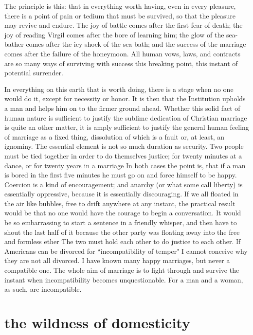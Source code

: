 \documentclass[final,10pt,letterpaper,twocolumn,openany]{book}
\begin{document}
The principle is this: that in everything worth having, even in every
pleasure, there is a point of pain or tedium that must be survived, so that
the pleasure may revive and endure. The joy of battle comes after the first
fear of death; the joy of reading Virgil comes after the bore of learning
him; the glow of the sea-bather comes after the icy shock of the sea bath;
and the success of the marriage comes after the failure of the honeymoon.
All human vows, laws, and contracts are so many ways of surviving with
success this breaking point, this instant of potential surrender.

In everything on this earth that is worth doing, there is a stage when no
one would do it, except for necessity or honor. It is then that the Institution
upholds a man and helps him on to the firmer ground ahead. Whether this
solid fact of human nature is sufficient to justify the sublime dedication of
Christian marriage is quite an other matter, it is amply sufficient to justify
the general human feeling of marriage as a fixed thing, dissolution of
which is a fault or, at least, an ignominy. The essential element is not so
much duration as security. Two people must be tied together in order to do
themselves justice; for twenty minutes at a dance, or for twenty years in a
marriage In both cases the point is, that if a man is bored in the first five
minutes he must go on and force himself to be happy. Coercion is a kind
of encouragement; and anarchy (or what some call liberty) is essentially
oppressive, because it is essentially discouraging. If we all floated in the
air like bubbles, free to drift anywhere at any instant, the practical result
would be that no one would have the courage to begin a conversation. It
would be so embarrassing to start a sentence in a friendly whisper, and
then have to shout the last half of it because the other party was floating
away into the free and formless ether The two must hold each other to do
justice to each other. If Americans can be divorced for ``incompatibility of
temper" I cannot conceive why they are not all divorced. I have known
many happy marriages, but never a compatible one. The whole aim of
marriage is to fight through and survive the instant when incompatibility
becomes unquestionable. For a man and a woman, as such, are
incompatible.

\section{the wildness of domesticity}
\end{document}
